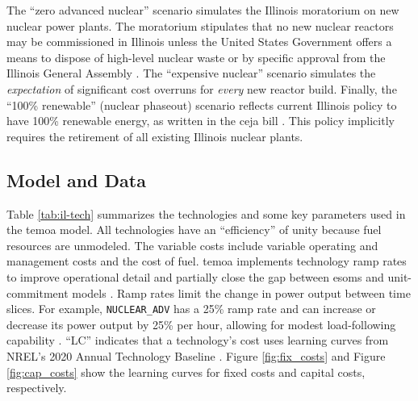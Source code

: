 \begin{table}[H]
  \centering
  \caption{Summary of Illinois Case Study Scenarios}
  \label{tab:il-scenarios}
\end{table}

The ``zero advanced nuclear'' scenario simulates the Illinois moratorium on new nuclear
power plants. The moratorium stipulates that no new nuclear reactors may be
commissioned in Illinois unless the United States Government offers a means to
dispose of high-level nuclear waste or by specific approval from the Illinois
General Assembly \cite{shea_states_2021}. The ``expensive nuclear'' scenario
simulates the \textit{expectation} of significant cost overruns for \textit{every}
new reactor build. Finally, the ``100\% renewable'' (nuclear phaseout) scenario reflects
current Illinois policy to have 100\% renewable energy, as written in the \gls{ceja} bill
\cite{harmon_climate_2021}. This policy implicitly requires the retirement of
all existing Illinois nuclear plants.

\subsection{Model and Data}

Table \ref{tab:il-tech} summarizes the technologies and some key parameters
used in the \gls{temoa} model. All technologies have an ``efficiency'' of unity
because fuel resources are unmodeled. The variable costs
include variable operating and management costs and the cost of fuel. \gls{temoa}
implements technology ramp rates to improve operational detail and partially
close the gap between \glspl{esom} and unit-commitment models \cite{de_queiroz_repurposing_2019}.
Ramp rates limit the change in power output between time slices. For example,
\texttt{NUCLEAR\_ADV} has a 25\% ramp rate and can increase or decrease
its power output by 25\% per hour, allowing for modest load-following capability
\cite{baseload_2017,lokhov_technical_2011}. ``LC'' indicates that a technology's cost
uses learning curves from NREL's 2020 Annual Technology Baseline \cite{nrel_2020_2020}.
Figure \ref{fig:fix_costs} and Figure \ref{fig:cap_costs} show the learning curves
for fixed costs and capital costs, respectively.

